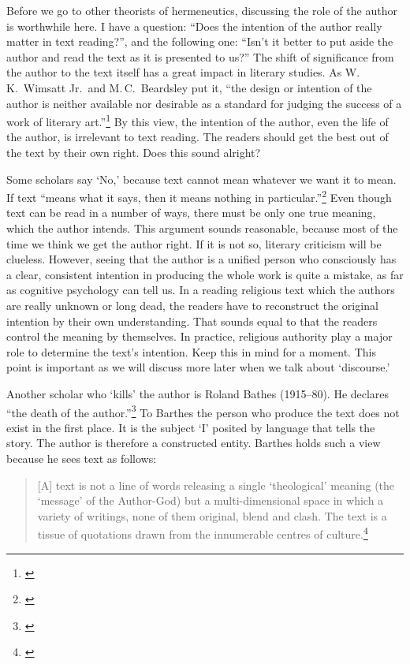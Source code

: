 Before we go to other theorists of hermeneutics, discussing the role of the author is worthwhile here. I have a question: ``Does the intention of the author really matter in text reading?'', and the following one: ``Isn't it better to put aside the author and read the text as it is presented to us?'' The shift of significance from the author to the text itself has a great impact in literary studies. As W.\,K.\ Wimsatt Jr.\ and M.\,C.\ Beardsley put it, ``the design or intention of the author is neither available nor desirable as a standard for judging the success of a work of literary art.''\footnote{\citealp[p.~468]{wimsatt:fallacy}} By this view, the intention of the author, even the life of the author, is irrelevant to text reading. The readers should get the best out of the text by their own right. Does this sound alright?

Some scholars say `No,' because text cannot mean whatever we want it to mean. If text ``means what it says, then it means nothing in particular.''\footnote{\citealp[p.~13]{hirsch:validity}} Even though text can be read in a number of ways, there must be only one true meaning, which the author intends. This argument sounds reasonable, because most of the time we think we get the author right. If it is not so, literary criticism will be clueless. However, seeing that the author is a unified person who consciously has a clear, consistent intention in producing the whole work is quite a mistake, as far as cognitive psychology can tell us. In a reading religious text which the authors are really unknown or long dead, the readers have to reconstruct the original intention by their own understanding. That sounds equal to that the readers control the meaning by themselves. In practice, religious authority play a major role to determine the text's intention. Keep this in mind for a moment. This point is important as we will discuss more later when we talk about `discourse.'

Another scholar who `kills' the author is Roland Bathes (1915--80). He declares ``the death of the author.''\footnote{\citealp[pp.~142--8]{barthes:image}} To Barthes the person who produce the text does not exist in the first place. It is the subject `I' posited by language that tells the story. The author is therefore a constructed entity. Barthes holds such a view because he sees text as follows:

\begin{quote}
[A] text is not a line of words releasing a single `theological' meaning (the `message' of the Author-God) but a multi-dimensional space in which a variety of writings, none of them original, blend and clash. The text is a tissue of quotations drawn from the innumerable centres of culture.\footnote{\citealp[p.~146]{barthes:image}}
\end{quote}

